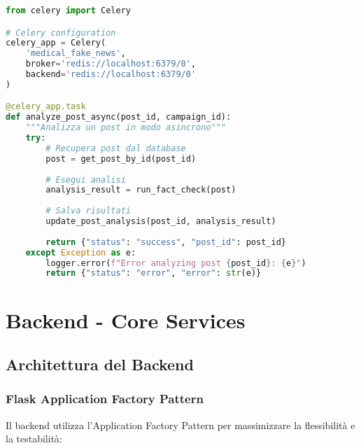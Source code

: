 \documentclass[12pt,a4paper]{report}
\begin{document}
\begin{lstlisting}[language=Python, caption=Celery Task Configuration]
from celery import Celery

# Celery configuration
celery_app = Celery(
    'medical_fake_news',
    broker='redis://localhost:6379/0',
    backend='redis://localhost:6379/0'
)

@celery_app.task
def analyze_post_async(post_id, campaign_id):
    """Analizza un post in modo asincrono"""
    try:
        # Recupera post dal database
        post = get_post_by_id(post_id)
        
        # Esegui analisi
        analysis_result = run_fact_check(post)
        
        # Salva risultati
        update_post_analysis(post_id, analysis_result)
        
        return {"status": "success", "post_id": post_id}
    except Exception as e:
        logger.error(f"Error analyzing post {post_id}: {e}")
        return {"status": "error", "error": str(e)}
\end{lstlisting}

\chapter{Backend - Core Services}

\section{Architettura del Backend}

\subsection{Flask Application Factory Pattern}

Il backend utilizza l'Application Factory Pattern per massimizzare la flessibilità e la testabilità:
\end{document}
